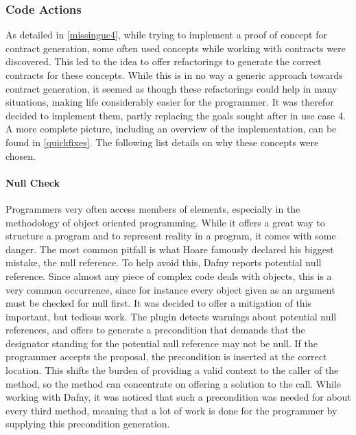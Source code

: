 \subsubsection{Code Actions}
As detailed in \ref{missinguc4}, while trying to implement a proof of concept for contract generation, some often used concepts while working with contracts were discovered. This led to the idea to offer refactorings to generate the correct contracts for these concepts. While this is in no way a generic approach towards contract generation, it seemed as though these refactorings could help in many situations, making life considerably easier for the programmer. It was therefor decided to implement them, partly replacing the goals sought after in use case 4. A more complete picture, including an overview of the implementation, can be found in \ref{quickfixes}. The following list details on why these concepts were chosen. \newline
 
\paragraph{Null Check}
Programmers very often access members of elements, especially in the methodology of object oriented programming. While it offers a great way to structure a program and to represent reality in a program, it comes with some danger. The most common pitfall is what Hoare famously declared his biggest mistake\cite{hoare}, the null reference. To help avoid this, Dafny reports potential null reference. Since almost any piece of complex code deals with objects, this is a very common occurrence, since for instance every object given as an argument must be checked for null first. \newline
It was decided to offer a mitigation of this important, but tedious work. The plugin detects warnings about potential null references, and offers to generate a precondition that demands that the designator standing for the potential null reference may not be null. If the programmer accepts the proposal, the precondition is inserted at the correct location. This shifts the burden of providing a valid context to the caller of the method, so the method can concentrate on offering a solution to the call. While working with Dafny, it was noticed that such a precondition was needed for about every third method, meaning that a lot of work is done for the programmer by supplying this precondition generation.
